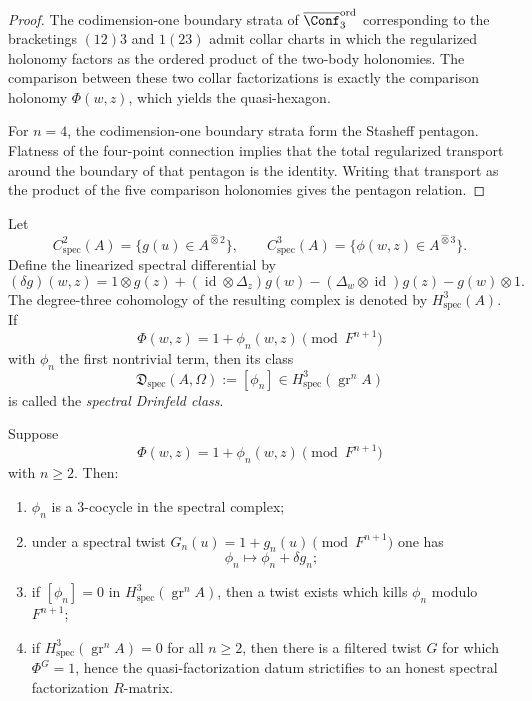 \begin{proof}
The codimension-one boundary strata of
$\overline{\Conf}_3^{\mathrm{ord}}$ corresponding to the bracketings
$(12)3$ and $1(23)$ admit collar charts in which the regularized
holonomy factors as the ordered product of the two-body holonomies.
The comparison between these two collar factorizations is exactly the
comparison holonomy $\Phi(w,z)$, which yields the quasi-hexagon.

For $n=4$, the codimension-one boundary strata form the Stasheff
pentagon. Flatness of the four-point connection implies that the total
regularized transport around the boundary of that pentagon is the
identity. Writing that transport as the product of the five comparison
holonomies gives the pentagon relation.
\end{proof}

\begin{definition}
Let
\[
C^2_{\mathrm{spec}}(A)=\{g(u)\in A^{\widehat\otimes 2}\},
\qquad
C^3_{\mathrm{spec}}(A)=\{\phi(w,z)\in A^{\widehat\otimes 3}\}.
\]
Define the linearized spectral differential by
\[
(\delta g)(w,z)
=
1\otimes g(z)
+ (\operatorname{id}\otimes \Delta_z)g(w)
- (\Delta_w\otimes \operatorname{id})g(z)
- g(w)\otimes 1.
\]
The degree-three cohomology of the resulting complex is denoted by
$H^3_{\mathrm{spec}}(A)$.
If
\[
\Phi(w,z)=1+\phi_n(w,z)\pmod{F^{n+1}}
\]
with $\phi_n$ the first nontrivial term, then its class
\[
\mathfrak D_{\mathrm{spec}}(A,\Omega):=[\phi_n]
\in H^3_{\mathrm{spec}}(\operatorname{gr}^n A)
\]
is called the \emph{spectral Drinfeld class}.
\end{definition}

\begin{theorem}
\ClaimStatusProvedHere
\label{thm:strictification-spectral-cohomology}
Suppose
\[
\Phi(w,z)=1+\phi_n(w,z)\pmod{F^{n+1}}
\]
with $n\ge 2$. Then:
\begin{enumerate}
\item $\phi_n$ is a $3$-cocycle in the spectral complex;
\item under a spectral twist $G_n(u)=1+g_n(u)\pmod{F^{n+1}}$ one has
 \[
 \phi_n\longmapsto \phi_n+\delta g_n;
 \]
\item if $[\phi_n]=0$ in
 $H^3_{\mathrm{spec}}(\operatorname{gr}^nA)$, then a twist exists which
 kills $\phi_n$ modulo $F^{n+1}$;
\item if $H^3_{\mathrm{spec}}(\operatorname{gr}^nA)=0$ for all $n\ge 2$,
 then there is a filtered twist $G$ for which $\Phi^G=1$, hence the
 quasi-factorization datum strictifies to an honest spectral
 factorization $R$-matrix.
\end{enumerate}
\end{theorem}

